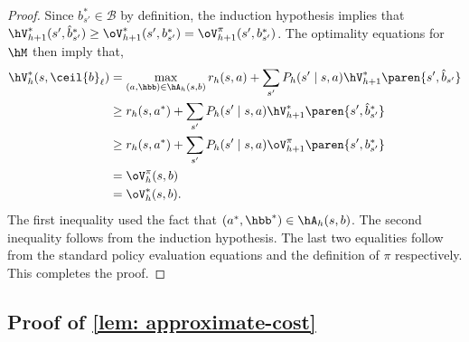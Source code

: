 \documentclass[pdftex, a4paper, 12pt]{article}
\newcommand{\round}[2]{\ceil{#2}_{#1}}
\newcommand{\mB}{\mathcal{B}}
\newcommand{\hb}{\hat{b}}
\begin{document}
\begin{proof}
    Since $b_{s'}^* \in \mB$ by definition, the induction hypothesis implies that $\hV^*_{h+1}(s', \hb_{s'}^*) \geq \oV^*_{h+1}(s', b_{s'}^*) = \oV^{\pi}_{h+1}(s', b_{s'}^*)$.
    The optimality equations for $\hM$ then imply that,
    \begin{align*}
        \hV^*_h(s,\round{\ell}{b}) &= \max_{(a,\hbb) \in \hA_h(s,b)} r_h(s, a) + \sum_{s'} P_h(s' \mid s,a) \hV_{h+1}^{*}\paren{s',\hb_{s'}} \\
        &\geq r_h(s, a^*) + \sum_{s'} P_h(s' \mid s,a) \hV_{h+1}^{*}\paren{s', \hb_{s'}^*}\\
        &\geq r_h(s, a^*) + \sum_{s'} P_h(s' \mid s,a) \oV_{h+1}^{\pi}\paren{s', b^*_{s'}} \\
        &= \oV_h^{\pi}(s,b) \\
        &= \oV_h^*(s,b).
    \end{align*}
    The first inequality used the fact that $(a^*, \hbb^*) \in \hA_h(s,b)$. The second inequality follows from the induction hypothesis. The last two equalities follow from the standard policy evaluation equations and the definition of $\pi$ respectively. 
    This completes the proof.
    
\end{proof}

\subsection{Proof of \texorpdfstring{\cref{lem: approximate-cost}}{lem: approximate-cost}}
\end{document}
